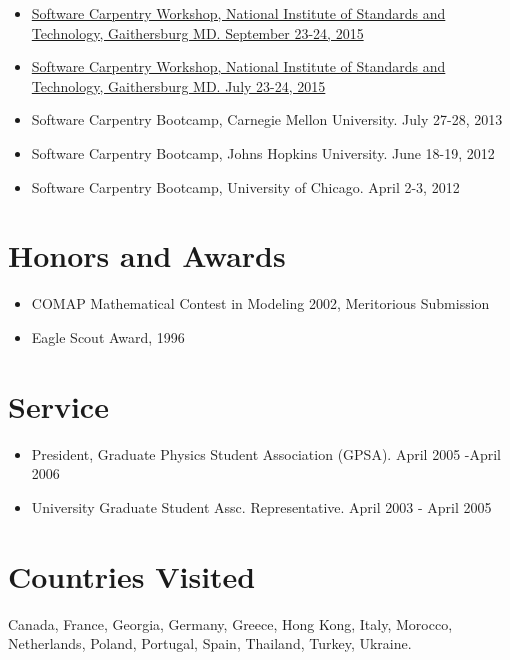 \begin{itemize}
\tightlist
\item
  \href{https://pages.nist.gov/2015-09-23-nist/}{Software Carpentry
  Workshop, National Institute of Standards and Technology, Gaithersburg
  MD. September 23-24, 2015}
\item
  \href{https://pages.nist.gov/2015-07-23-nist/}{Software Carpentry
  Workshop, National Institute of Standards and Technology, Gaithersburg
  MD. July 23-24, 2015}
\item
  Software Carpentry Bootcamp, Carnegie Mellon University. July 27-28,
  2013
\item
  Software Carpentry Bootcamp, Johns Hopkins University. June 18-19,
  2012
\item
  Software Carpentry Bootcamp, University of Chicago. April 2-3, 2012
\end{itemize}

\section{Honors and Awards}\label{honors-and-awards}

\begin{itemize}
\tightlist
\item
  COMAP Mathematical Contest in Modeling 2002, Meritorious Submission
\item
  Eagle Scout Award, 1996
\end{itemize}

\section{Service}\label{service}

\begin{itemize}
\tightlist
\item
  President, Graduate Physics Student Association (GPSA). April 2005
  -April 2006
\item
  University Graduate Student Assc. Representative. April 2003 - April
  2005
\end{itemize}

\section{Countries Visited}\label{countries-visited}

Canada, France, Georgia, Germany, Greece, Hong Kong, Italy, Morocco,
Netherlands, Poland, Portugal, Spain, Thailand, Turkey, Ukraine.

